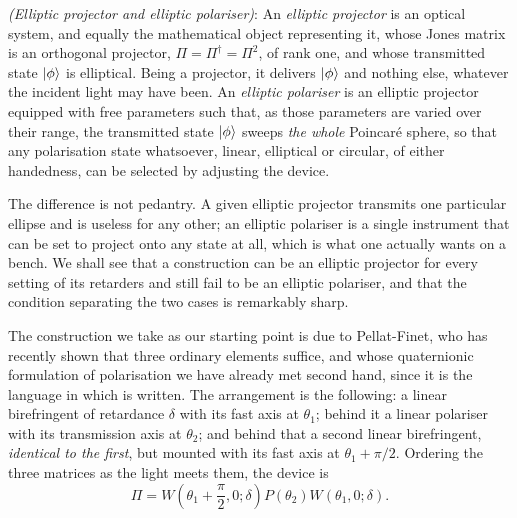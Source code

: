             \begin{myDef}
                \textit{(Elliptic projector and elliptic polariser)}: An \emph{elliptic projector} is an optical system, and equally the mathematical object representing it, whose Jones matrix is an orthogonal projector, $\Pi=\Pi^{\dagger}=\Pi^2$, of rank one, and whose transmitted state $\ket{\phi}$ is elliptical. Being a projector, it delivers $\ket{\phi}$ and nothing else, whatever the incident light may have been. An \emph{elliptic polariser} is an elliptic projector equipped with free parameters such that, as those parameters are varied over their range, the transmitted state $\ket{\phi}$ sweeps \textit{the whole} Poincaré sphere, so that any polarisation state whatsoever, linear, elliptical or circular, of either handedness, can be selected by adjusting the device.
            \end{myDef}

            The difference is not pedantry. A given elliptic projector transmits one particular ellipse and is useless for any other; an elliptic polariser is a single instrument that can be set to project onto any state at all, which is what one actually wants on a bench. We shall see that a construction can be an elliptic projector for every setting of its retarders and still fail to be an elliptic polariser, and that the condition separating the two cases is remarkably sharp.

            The construction we take as our starting point is due to Pellat-Finet, who has recently shown that three ordinary elements suffice, and whose quaternionic formulation of polarisation \citep{pellatfinet1984representation} we have already met second hand, since it is the language in which \citep{pabon2023tunable} is written. The arrangement is the following: a linear birefringent of retardance $\delta$ with its fast axis at $\theta_1$; behind it a linear polariser with its transmission axis at $\theta_2$; and behind that a second linear birefringent, \textit{identical to the first}, but mounted with its fast axis at $\theta_1+\pi/2$. Ordering the three matrices as the light meets them, the device is
            \begin{equation}\label{eq:EllipticProjectorChain}
                \Pi = W\left(\theta_1+\frac{\pi}{2},0;\delta\right)P\left(\theta_2\right)W\left(\theta_1,0;\delta\right).
            \end{equation}

